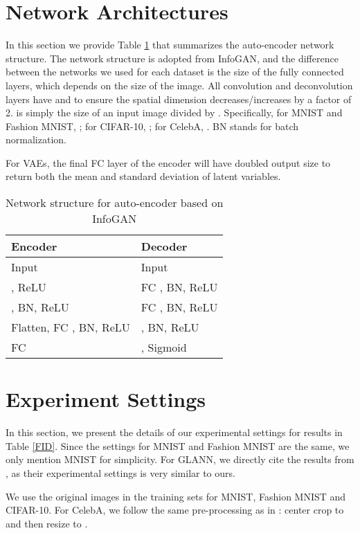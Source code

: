 \documentclass{article}
\begin{document}
\newpage
\appendix
\appendixpage
\section{Network Architectures} \label{AppA}
In this section we provide Table \ref{netstruct} that summarizes the auto-encoder network structure. The network structure is adopted from InfoGAN\citep{InfoGAN}, and the difference between the networks we used for each dataset is the size of the fully connected layers, which depends on the size of the image. All convolution and deconvolution layers have  and  to ensure the spatial dimension decreases/increases by a factor of 2.  is simply the size of an input image divided by . Specifically, for MNIST and Fashion MNIST, ; for CIFAR-10, ; for CelebA, . BN stands for batch normalization.

For VAEs, the final FC layer of the encoder will have doubled output size to return both the mean and standard deviation of latent variables. 

\begin{table}
  \caption{Network structure for auto-encoder based on InfoGAN}
  \label{netstruct}
  \centering
  \begin{tabular}{ll}
    \toprule
    Encoder   & Decoder    \\
    \midrule
     Input    &      Input  \\
      , ReLU   &  FC , BN, ReLU\\
      , BN, ReLU &  FC , BN, ReLU \\
     Flatten, FC , BN, ReLU &  , BN, ReLU \\
     FC  &  , Sigmoid\\
    \bottomrule
  \end{tabular}
\end{table}



\section{Experiment Settings} \label{AppB}
In this section, we present the details of our experimental settings for results in Table \ref{FID}. Since the settings for MNIST and Fashion MNIST are the same, we only mention MNIST for simplicity. For GLANN, we directly cite the results from \citep{NAIS}, as their experimental settings is very similar to ours. 

We use the original images in the training sets for MNIST, Fashion MNIST and CIFAR-10. For CelebA, we follow the same pre-processing as in \citep{AreGan}: center crop to  and then resize to . 
\end{document}

